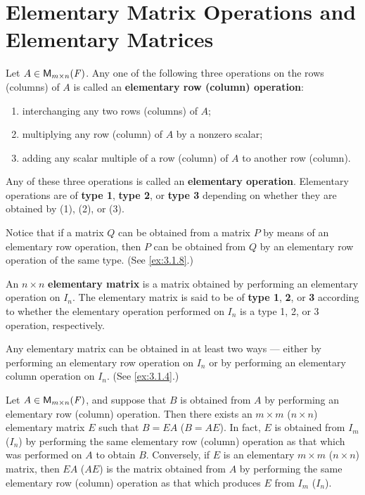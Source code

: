 \section{Elementary Matrix Operations and Elementary Matrices}\label{sec:3.1}

\begin{defn}\label{3.1.1}
	Let \(A \in \mathsf{M}_{{m} \times n}({\mathit{F}})\).
	Any one of the following three operations on the rows (columns) of \(A\) is called an \textbf{elementary row (column) operation}:
	\begin{enumerate}[label=(\arabic*)]
		\item interchanging any two rows (columns) of \(A\);
		\item multiplying any row (column) of \(A\) by a nonzero scalar;
		\item adding any scalar multiple of a row (column) of \(A\) to another row (column).
	\end{enumerate}
	Any of these three operations is called an \textbf{elementary operation}.
	Elementary operations are of \textbf{type 1}, \textbf{type 2}, or \textbf{type 3} depending on whether they are obtained by (1), (2), or (3).
\end{defn}

\begin{note}
	Notice that if a matrix \(Q\) can be obtained from a matrix \(P\) by means of an elementary row operation, then \(P\) can be obtained from \(Q\) by an elementary row operation of the same type.
	(See \cref{ex:3.1.8}.)
\end{note}

\begin{defn}\label{3.1.2}
	An \(n \times n\) \textbf{elementary matrix} is a matrix obtained by performing an elementary operation on \(I_n\).
	The elementary matrix is said to be of \textbf{type 1}, \textbf{2}, or \textbf{3} according to whether the elementary operation performed on \(I_n\) is a type 1, 2, or 3 operation, respectively.
\end{defn}

\begin{note}
	Any elementary matrix can be obtained in at least two ways ---
	either by performing an elementary row operation on \(I_n\) or by performing an elementary column operation on \(I_n\).
	(See \cref{ex:3.1.4}.)
\end{note}

\begin{thm}\label{3.1}
	Let \(A \in \mathsf{M}_{{m} \times n}({\mathit{F}})\), and suppose that \(B\) is obtained from \(A\) by performing an elementary row (column) operation.
	Then there exists an \(m \times m\) (\(n \times n\)) elementary matrix \(E\) such that \(B = EA\) (\(B = AE\)).
	In fact, \(E\) is obtained from \(I_m\) (\(I_n\)) by performing the same elementary row (column) operation as that which was performed on \(A\) to obtain \(B\).
	Conversely, if \(E\) is an elementary \(m \times m\) (\(n \times n\)) matrix, then \(EA\) (\(AE\)) is the matrix obtained from \(A\) by performing the same elementary row (column) operation as that which produces \(E\) from \(I_m\) (\(I_n\)).
\end{thm}

